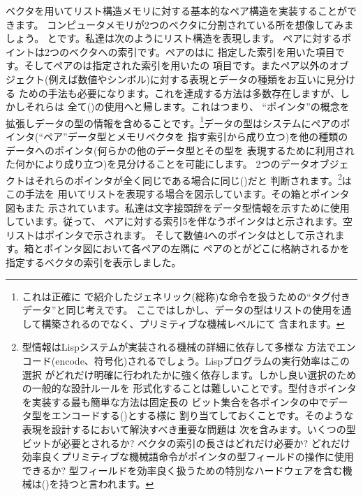 ベクタを用いてリスト構造メモリに対する基本的なペア構造を実装することができます。
コンピュータメモリが2つのベクタに分割されている所を想像してみましょう。
とです。私達は次のようにリスト構造を表現します。
ペアに対するポイントは2つのベクタへの索引です。ペアのはに
指定した索引を用いた項目です。そしてペアのは指定された索引を用いたの
項目です。またペア以外のオブジェクト(例えば数値やシンボル)に対する表現とデータの種類をお互いに見分ける
ための手法も必要になります。これを達成する方法は多数存在しますが、しかしそれらは
全て()の使用へと帰します。これはつまり、
``ポインタ''の概念を拡張しデータの型の情報を含めることです。\footnote{これは正確に
で紹介したジェネリック(総称)な命令を扱うための``タグ付きデータ''と同じ考えです。
ここではしかし、データの型はリストの使用を通して構築されるのでなく、プリミティブな機械レベルにて
含まれます。}データの型はシステムにペアのポインタ(``ペア''データ型とメモリベクタを
指す索引から成り立つ)を他の種類のデータへのポインタ(何らかの他のデータ型とその型を
表現するために利用された何かにより成り立つ)を見分けることを可能にします。
2つのデータオブジェクトはそれらのポインタが全く同じである場合に同じ()だと
判断されます。\footnote{型情報はLispシステムが実装される機械の詳細に依存して多様な
方法でエンコード(encode、符号化)されるでしょう。Lispプログラムの実行効率はこの選択
がどれだけ明確に行われたかに強く依存します。しかし良い選択のための一般的な設計ルールを
形式化することは難しいことです。型付きポインタを実装する最も簡単な方法は固定長の
ビット集合を各ポインタの中でデータ型をエンコードする()とする様に
割り当てしておくことです。そのような表現を設計するにおいて解決すべき重要な問題は
次を含みます。いくつの型ビットが必要とされるか? ベクタの索引の長さはどれだけ必要か?
どれだけ効率良くプリミティブな機械語命令がポインタの型フィールドの操作に使用できるか?
型フィールドを効率良く扱うための特別なハードウェアを含む機械は()を持つと言われます。}はこの手法を
用いてリストを表現する場合を図示しています。その箱とポインタ図もまた
示されています。私達は文字接頭辞をデータ型情報を示すために使用しています。従って、
ペアに対する索引5を伴なうポインタはと示されます。空リストはポインタで示されます。
そして数値4へのポインタはとして示されます。箱とポインタ図において各ペアの左隅に
ペアのとがどこに格納されるかを指定するベクタの索引を表示しました。

